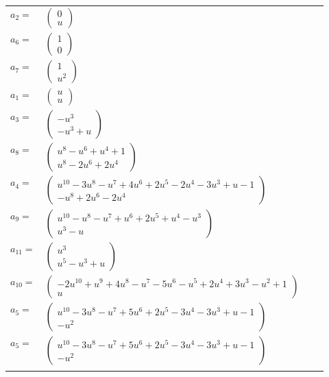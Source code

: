 \documentclass[1p]{elsarticle_modified}
\theoremstyle{definition}
\begin{document}
\begin{tabular}{m{7pt} m{180pt} m{7pt} m{180pt} }
\flushright $a_{2}=$&$\begin{pmatrix}0\\u\end{pmatrix}$ \\
\flushright $a_{6}=$&$\begin{pmatrix}1\\0\end{pmatrix}$ \\
\flushright $a_{7}=$&$\begin{pmatrix}1\\u^2\end{pmatrix}$ \\
\flushright $a_{1}=$&$\begin{pmatrix}u\\u\end{pmatrix}$ \\
\flushright $a_{3}=$&$\begin{pmatrix}- u^3\\- u^3+u\end{pmatrix}$ \\
\flushright $a_{8}=$&$\begin{pmatrix}u^8- u^6+u^4+1\\u^8-2 u^6+2 u^4\end{pmatrix}$ \\
\flushright $a_{4}=$&$\begin{pmatrix}u^{10}-3 u^8- u^7+4 u^6+2 u^5-2 u^4-3 u^3+u-1\\- u^8+2 u^6-2 u^4\end{pmatrix}$ \\
\flushright $a_{9}=$&$\begin{pmatrix}u^{10}- u^8- u^7+u^6+2 u^5+u^4- u^3\\u^3- u\end{pmatrix}$ \\
\flushright $a_{11}=$&$\begin{pmatrix}u^3\\u^5- u^3+u\end{pmatrix}$ \\
\flushright $a_{10}=$&$\begin{pmatrix}-2 u^{10}+u^9+4 u^8- u^7-5 u^6- u^5+2 u^4+3 u^3- u^2+1\\u\end{pmatrix}$ \\
\flushright $a_{5}=$&$\begin{pmatrix}u^{10}-3 u^8- u^7+5 u^6+2 u^5-3 u^4-3 u^3+u-1\\- u^2\end{pmatrix}$\\ \flushright $a_{5}=$&$\begin{pmatrix}u^{10}-3 u^8- u^7+5 u^6+2 u^5-3 u^4-3 u^3+u-1\\- u^2\end{pmatrix}$\\&\end{tabular}
\end{document}
